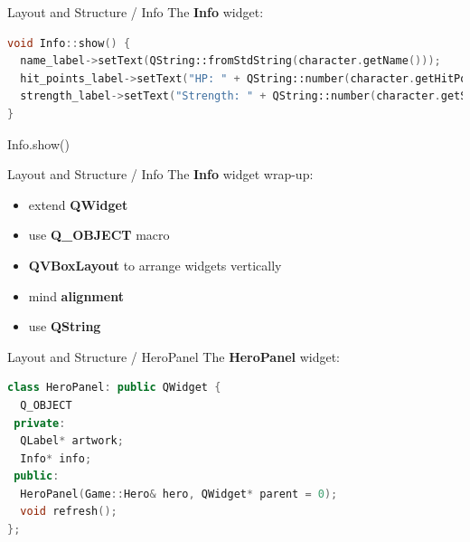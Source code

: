 \documentclass[11pt]{beamer}
\renewcommand{\emph}[1]{\textbf{#1}}
\begin{document}
\begin{frame}[fragile]{Layout and Structure / Info}
 The \emph{Info} widget:
 \begin{lstlisting}[language=C++]
void Info::show() {
  name_label->setText(QString::fromStdString(character.getName()));
  hit_points_label->setText("HP: " + QString::number(character.getHitPoints()) + "/" + QString::number(character.getMaxHitPoints()));
  strength_label->setText("Strength: " + QString::number(character.getStrength()));
}
\end{lstlisting}
 {\footnotesize Info.show()}
\end{frame}

\begin{frame}[fragile]{Layout and Structure / Info}
 The \emph{Info} widget wrap-up:
 \begin{itemize}
  \item extend \emph{QWidget}
  \item use \emph{Q\_OBJECT} macro
  \item \emph{QVBoxLayout} to arrange widgets vertically
  \item mind \emph{alignment}
  \item use \emph{QString}
 \end{itemize}
\end{frame}

\begin{frame}[fragile]{Layout and Structure / HeroPanel}
 The \emph{HeroPanel} widget:
 \begin{center}
 \end{center}
 \begin{lstlisting}[language=C++]
class HeroPanel: public QWidget {
  Q_OBJECT
 private:
  QLabel* artwork;
  Info* info;
 public:
  HeroPanel(Game::Hero& hero, QWidget* parent = 0);
  void refresh();
};
\end{lstlisting}
\end{frame}
\end{document}
